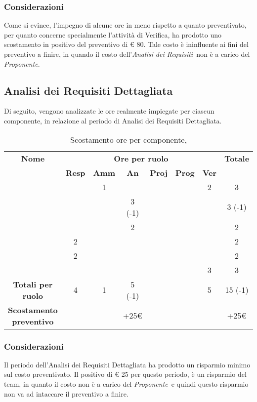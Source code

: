 \subsubsection{Considerazioni}
Come si evince, l'impegno di alcune ore in meno rispetto a quanto preventivato, per quanto concerne specialmente l'attività di Verifica, ha prodotto uno scostamento in positivo del preventivo di € 80. Tale costo è ininfluente ai fini del preventivo a finire, in quando il costo dell'\textit{Analisi dei Requisiti}\ non è a carico del \textit{Proponente}.


\newpage
\subsection{Analisi dei Requisiti Dettagliata}

Di seguito, vengono analizzate le ore realmente impiegate per ciascun componente, in relazione al periodo di Analisi dei Requisiti Dettagliata.

\begin{table}[H]
	\begin{center}
		\begin{tabular}{|c|c|c|c|c|c|c|c|}
			\hline
			\textbf{Nome} & \multicolumn{6}{c|}{\textbf{Ore per ruolo}} & \textbf{Totale} \\\cline{2-7}
			& \textbf{Resp} & \textbf{Amm} & \textbf{An} & \textbf{Proj} & \textbf{Prog} & \textbf{Ver} & \\
			\hline
			\MC			&		&	1	&	 	&		&		&	2 	&	 3	\\
			\hline
			\AN			&		&		&	3 (-1) 	&	 	&		&	 	& 	 3 (-1)	\\
			\hline
			\DAN		&		&	 	&	2 	&		&		&		&	 2	\\
			\hline
			\AS			&	2	&	 	&	  	&		&	 	& 		&	 2	\\
			\hline
			\NS 		&	2	&		&	 	&		&		& 		&	 2	\\
			\hline
			\DS			& 		&	 	&	 	&		&		&	3 	&	 3	\\
			\hline
			\textbf{Totali per ruolo}	& 	4	&	1	&	5 (-1)	&		&		&	5	&	15 (-1)	\\
			\hline
			\textbf{Scostamento preventivo}	& 		&		&	+25€	&		&		&	&	+25€	\\
			\hline
		\end{tabular}
	\end{center}
	\caption{Scostamento ore per componente, \ARD}
\end{table}

\subsubsection{Considerazioni}
Il periodo dell'Analisi dei Requisiti Dettagliata ha prodotto un risparmio minimo sul costo preventivato. Il positivo di € 25 per questo periodo, è un risparmio del team, in quanto il costo non è a carico del \textit{Proponente}\ e quindi questo risparmio non va ad intaccare il preventivo a finire.

